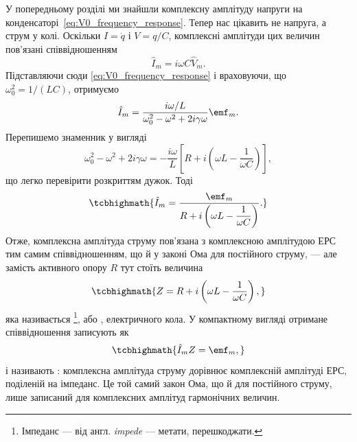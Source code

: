 У попередньому розділі ми знайшли комплексну амплітуду напруги на конденсаторі~\eqref{eq:V0_frequency_response}. Тепер нас цікавить не напруга, а струм у колі. Оскільки $I = \dot{q}$ і $V = q/C$, комплексні амплітуди цих величин пов'язані співвідношенням
\begin{equation}\label{eq:I_from_V}
	\hat{I}_m = i\omega C \hat{V}_m.
\end{equation}
Підставляючи сюди \eqref{eq:V0_frequency_response} і враховуючи, що $\omega_0^2 = 1/(LC)$, отримуємо
\begin{equation}\label{eq:I0_explicit}
	\hat{I}_m = \frac{i\omega / L}{\omega_0^2 - \omega^2 + 2i\gamma\omega}\emf_m.
\end{equation}
Перепишемо знаменник у вигляді
\begin{equation}\label{eq:denominator_impedance}
	\omega_0^2 - \omega^2 + 2i\gamma\omega = -\frac{i\omega}{L}\left[R + i\left(\omega L - \frac{1}{\omega C}\right)\right],
\end{equation}
що легко перевірити розкриттям дужок. Тоді
\begin{equation}\label{eq:Ohm_complex_derived}
	\tcbhighmath{
		\hat{I}_m = \frac{\emf_m}{R + i\left(\omega L - \dfrac{1}{\omega C}\right)}.
	}
\end{equation}
Отже, комплексна амплітуда струму пов'язана з комплексною амплітудою ЕРС тим самим співвідношенням, що й у законі Ома для постійного струму, --- але замість активного опору $R$ тут стоїть величина
\begin{equation}\label{eq:impedance}
	\tcbhighmath{
		Z = R + i\left(\omega L - \frac{1}{\omega C}\right),
	}
\end{equation}
яка називається \footnote{Імпеданс --- від англ. \emph{impede} --- метати, перешкоджати.}, або , електричного кола. У компактному вигляді отримане співвідношення записують як
\begin{equation}\label{eq:Ohm_complex}
	\tcbhighmath{
		\hat{I}_m Z = \emf_m,
	}
\end{equation}
і називають : комплексна амплітуда струму дорівнює комплексній амплітуді ЕРС, поділеній на імпеданс. Це той самий закон Ома, що й для постійного струму, лише записаний для комплексних амплітуд гармонічних величин.

